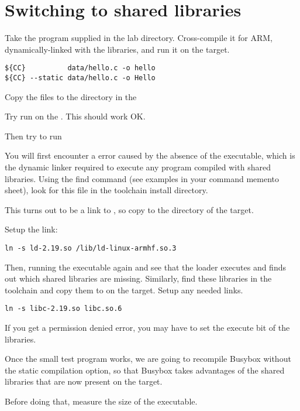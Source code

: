 \section{Switching to shared libraries}

Take the  program supplied in the lab 
directory. Cross-compile it for ARM, dynamically-linked with the
libraries, and run it on the target.

\begin{verbatim}
${CC}          data/hello.c -o hello
${CC} --static data/hello.c -o Hello
\end{verbatim}

Copy the files to the  directory in the   

Try run  on the \devboard. This should work OK.

Then try to run 

You will first encounter a  error caused by the absence of
the  executable, which is the dynamic linker
required to execute any program compiled with shared libraries. Using
the find command (see examples in your command memento sheet), look
for this file in the toolchain install directory.

This turns out to be a link to , so copy 
to the  directory of the target.

Setup the link:

\begin{verbatim}
ln -s ld-2.19.so /lib/ld-linux-armhf.so.3
\end{verbatim}

Then, running the executable again and see that the loader executes
and finds out which shared libraries are missing. Similarly, find
these libraries in the toolchain and copy them to  on the
target. Setup any needed links.

\begin{verbatim}
ln -s libc-2.19.so libc.so.6
\end{verbatim}

If you get a permission denied error, you may have to set the execute bit
of the libraries.

Once the small test program works, we are going to recompile Busybox
without the static compilation option, so that Busybox takes advantages of the
shared libraries that are now present on the target.

Before doing that, measure the size of the  executable.

